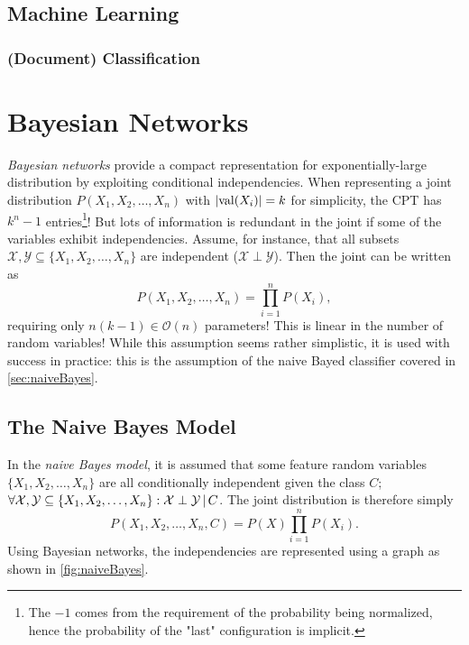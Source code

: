 	\section{Machine Learning} %

		\subsection{(Document) Classification} %

\chapter{Bayesian Networks}
	\emph{Bayesian networks} provide a compact representation for exponentially-large distribution by exploiting conditional independencies. When representing a joint distribution \( P(X_1, X_2, \dots, X_n) \) with \( \lvert \operatorname{val}(X_i) \rvert = k \) for simplicity, the CPT has \(k^n - 1\) entries\footnote{The \(-1\) comes from the requirement of the probability being normalized, hence the probability of the "last" configuration is implicit.}! But lots of information is redundant in the joint if some of the variables exhibit independencies. Assume, for instance, that all subsets \( \mathcal{X}, \mathcal{Y} \subseteq \{ X_1, X_2, \dots, X_n \} \) are independent (\( \mathcal{X} \perp \mathcal{Y} \)). Then the joint can be written as
	\begin{equation}
		P(X_1, X_2, \dots, X_n) = \prod_{i = 1}^{n} P(X_i),
	\end{equation}
	requiring only \( n (k - 1) \in \mathcal{O}(n) \) parameters! This is linear in the number of random variables! While this assumption seems rather simplistic, it is used with success in practice: this is the assumption of the naive Bayed classifier covered in \autoref{sec:naiveBayes}.

	\section{The Naive Bayes Model}
		\label{sec:naiveBayes}

		In the \emph{naive Bayes model}, it is assumed that some feature random variables \( \{ X_1, X_2, \dots, X_n \} \) are all conditionally independent given the class \(C\); \( \forall \mathcal{X}, \mathcal{Y} \subseteq \{ X_1, X_2, \dots, X_n \} : \mathcal{X} \perp \mathcal{Y} \,\vert\, C \). The joint distribution is therefore simply
		\begin{equation}
			P(X_1, X_2, \dots, X_n, C) = P(X) \prod_{i = 1}^{n} P(X_i).  \label{eq:naiveBayesJoint}
		\end{equation}
		Using Bayesian networks, the independencies are represented using a graph as shown in \autoref{fig:naiveBayes}.

